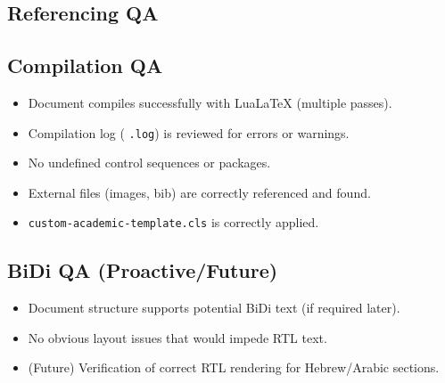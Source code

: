\documentclass{custom-academic-template}
\begin{document}
\subsection{Referencing QA}

\subsection{Compilation QA}
\begin{itemize}
    \item [ ] Document compiles successfully with LuaLaTeX (multiple passes).
    \item [ ] Compilation log (	\texttt{.log}) is reviewed for errors or warnings.
    \item [ ] No undefined control sequences or packages.
    \item [ ] External files (images, bib) are correctly referenced and found.
    \item [ ] 	\texttt{custom-academic-template.cls} is correctly applied.
\end{itemize}

\subsection{BiDi QA (Proactive/Future)}
\begin{itemize}
    \item [ ] Document structure supports potential BiDi text (if required later).
    \item [ ] No obvious layout issues that would impede RTL text.
    \item [ ] (Future) Verification of correct RTL rendering for Hebrew/Arabic sections.
\end{itemize}
\end{document}
